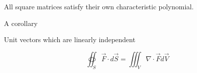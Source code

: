 \documentclass[12pt]{article}
\begin{document}
\begin{theorem}
  All square matrices satisfy their own characteristic polynomial.
\end{theorem}

\begin{corollary}[Example]
  A corollary
\end{corollary}

\begin{definition}[Orthonormal]
  Unit vectors which are linearly independent
\end{definition}

\[
  \oiint_S \vec{F} \cdot d\vec{S} = \iiint_V \nabla \cdot \vec{F} d\vec{V}
\]

\[
             
\]
\end{document}
